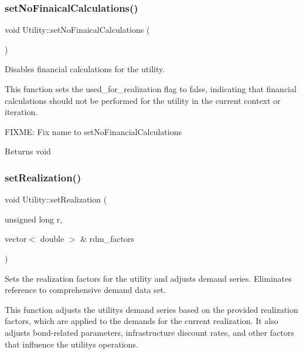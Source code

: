 \subsubsection{\texorpdfstring{set\+No\+Finaical\+Calculations()}{setNoFinaicalCalculations()}}
{\footnotesize\ttfamily void Utility\+::set\+No\+Finaical\+Calculations (\begin{DoxyParamCaption}{ }\end{DoxyParamCaption})}



Disables financial calculations for the utility. 

This function sets the used\+\_\+for\+\_\+realization flag to false, indicating that financial calculations should not be performed for the utility in the current context or iteration.

F\+I\+X\+ME\+: Fix name to set\+No\+Financial\+Calculations

\begin{DoxyReturn}{Returns}
void 
\end{DoxyReturn}
\mbox{\label{classUtility_a2d41989b4154aed5c2fb99a27183ca34}} 
\subsubsection{\texorpdfstring{set\+Realization()}{setRealization()}}
{\footnotesize\ttfamily void Utility\+::set\+Realization (\begin{DoxyParamCaption}\item[{unsigned long}]{r,  }\item[{vector$<$ double $>$ \&}]{rdm\+\_\+factors }\end{DoxyParamCaption})}



Sets the realization factors for the utility and adjusts demand series. Eliminates reference to comprehensive demand data set. 

This function adjusts the utility\textquotesingle{}s demand series based on the provided realization factors, which are applied to the demands for the current realization. It also adjusts bond-\/related parameters, infrastructure discount rates, and other factors that influence the utility\textquotesingle{}s operations.


